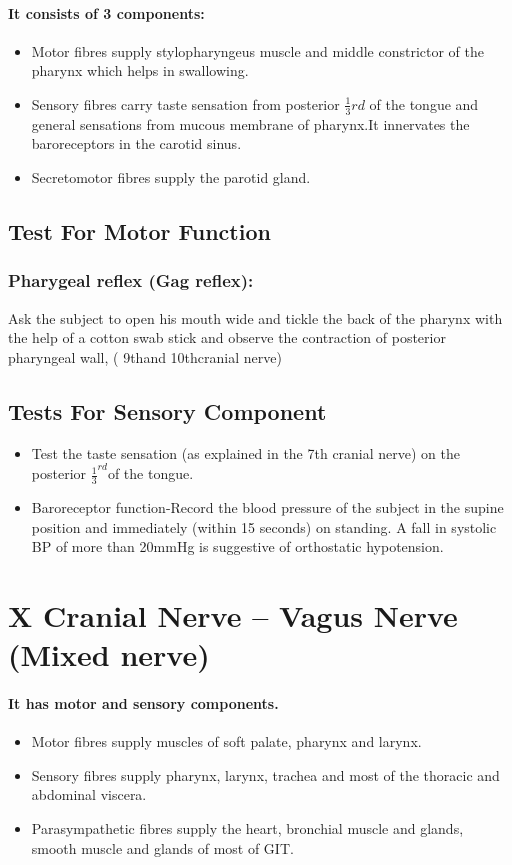 \documentclass[a4paper,12pt,openany,oneside]{book}
\begin{document}
\paragraph{It consists of 3 components:}
\begin{itemize}
\item[]Motor fibres supply stylopharyngeus muscle and middle constrictor of the pharynx which helps in swallowing.
\item[]Sensory fibres carry taste sensation from posterior $\frac{1}{3}$${rd}$ of the tongue and general sensations from mucous membrane of pharynx.It innervates the baroreceptors in the carotid sinus.
\item[]Secretomotor fibres supply the parotid gland.
\end{itemize}

\subsection*{Test For Motor Function}
\subsubsection*{Pharygeal reflex (Gag reflex):}
Ask the subject to open his mouth wide and tickle the back of the pharynx with the help of a cotton swab stick and observe the contraction of posterior pharyngeal wall, ( 9thand 10thcranial nerve)

\subsection*{Tests For Sensory Component}
\begin{itemize}
\item{Test the taste sensation (as explained in the 7th cranial nerve) on the posterior $\frac{1}{3}^{rd}$of the tongue.}
\item{Baroreceptor function-Record the blood pressure of the subject in the supine position and immediately (within 15 seconds) on standing. A fall in systolic BP of more than 20mmHg is suggestive of orthostatic hypotension.}
\end{itemize}

\section*{X Cranial Nerve – Vagus Nerve (Mixed nerve)}
\paragraph{It has motor and sensory components.}
\begin{itemize}
\item[]Motor fibres supply muscles of soft palate, pharynx and larynx.
\item[]Sensory fibres supply pharynx, larynx, trachea and most of the thoracic and abdominal viscera.
\item[]Parasympathetic fibres supply the heart, bronchial muscle and glands, smooth muscle and glands of most of GIT.
\end{itemize}
\end{document}
